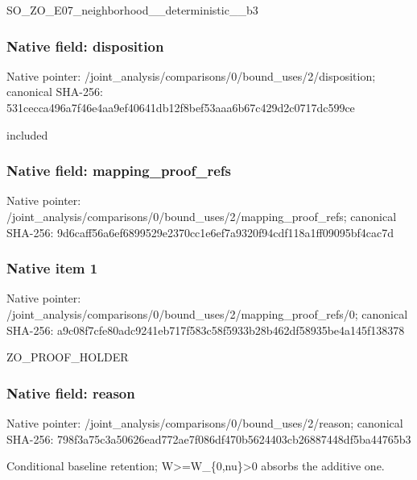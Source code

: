 \documentclass[10pt,a4paper]{article}
\begin{document}
\begingroup\raggedright\sloppy SO\_\allowbreak{}ZO\_\allowbreak{}E07\_\allowbreak{}neighborhood\_\allowbreak{}\_\allowbreak{}deterministic\_\allowbreak{}\_\allowbreak{}b3\par\endgroup

\subsubsection{Native field: disposition}
Native pointer: /joint\_\allowbreak{}analysis/comparisons/0/bound\_\allowbreak{}uses/2/disposition; canonical SHA-256: 531cecca496a7f46e4aa9ef40641db12f8bef53aaa6b67c429d2c0717dc599ce

\begingroup\raggedright\sloppy included\par\endgroup

\subsubsection{Native field: mapping\_\allowbreak{}proof\_\allowbreak{}refs}
Native pointer: /joint\_\allowbreak{}analysis/comparisons/0/bound\_\allowbreak{}uses/2/mapping\_\allowbreak{}proof\_\allowbreak{}refs; canonical SHA-256: 9d6caff56a6ef6899529e2370cc1e6ef7a9320f94cdf118a1ff09095bf4cac7d

\subsubsection{Native item 1}
Native pointer: /joint\_\allowbreak{}analysis/comparisons/0/bound\_\allowbreak{}uses/2/mapping\_\allowbreak{}proof\_\allowbreak{}refs/0; canonical SHA-256: a9c08f7cfe80adc9241eb717f583c58f5933b28b462df58935be4a145f138378

\begingroup\raggedright\sloppy ZO\_\allowbreak{}PROOF\_\allowbreak{}HOLDER\par\endgroup

\subsubsection{Native field: reason}
Native pointer: /joint\_\allowbreak{}analysis/comparisons/0/bound\_\allowbreak{}uses/2/reason; canonical SHA-256: 798f3a75c3a50626ead772ae7f086df470b5624403cb26887448df5ba44765b3

\begingroup\raggedright\sloppy Conditional baseline retention;\allowbreak{} W>=\allowbreak{}W\_\allowbreak{}\{0,\allowbreak{}nu\}>0 absorbs the additive one.\par\endgroup
\end{document}
